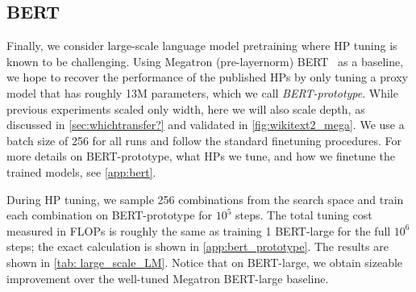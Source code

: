 \documentclass{article}
\theoremstyle{definition}
\begin{document}
\subsection{BERT}
\label{sec:BERT}

Finally, we consider large-scale language model pretraining where HP tuning is known to be challenging.
Using Megatron (pre-layernorm) BERT~\cite{megatron} as a baseline, we hope to recover the performance of the published HPs by only tuning a proxy model that has roughly 13M parameters, which we call \emph{BERT-prototype}.
While previous experiments scaled only width, here we will also scale depth, as discussed in \cref{sec:whichtransfer?} and validated in \cref{fig:wikitext2_mega}.
We use a batch size of 256 for all runs and follow the standard finetuning procedures.
For more details on BERT-prototype, what HPs we tune, and how we finetune the trained models, see \cref{app:bert}.

During HP tuning, we sample 256 combinations from the search space and train each combination on BERT-prototype for $10^5$ steps.
The total tuning cost measured in FLOPs is roughly the same as training 1 BERT-large for the full $10^6$ steps; the exact calculation is shown in \cref{app:bert_prototype}.
The results are shown in \cref{tab: large_scale_LM}.
Notice that on BERT-large, we obtain sizeable improvement over the well-tuned Megatron BERT-large baseline.
\end{document}
